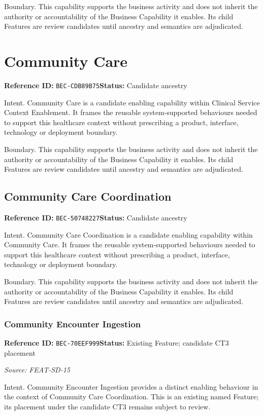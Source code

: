 \documentclass[11pt,a4paper,openany]{book}
\begin{document}
Boundary. This capability supports the business activity and does not inherit the authority or accountability of the Business Capability it enables. Its child Features are review candidates until ancestry and semantics are adjudicated.

\section{Community Care}\label{cap:bec-cdb89b75}
\noindent\textbf{Reference ID:} \texttt{BEC-CDB89B75}\quad \textbf{Status:} Candidate ancestry\par
Intent. Community Care is a candidate enabling capability within Clinical Service Context Enablement. It frames the reusable system-supported behaviours needed to support this healthcare context without prescribing a product, interface, technology or deployment boundary.

Boundary. This capability supports the business activity and does not inherit the authority or accountability of the Business Capability it enables. Its child Features are review candidates until ancestry and semantics are adjudicated.

\subsection{Community Care Coordination}\label{cap:bec-50748227}
\noindent\textbf{Reference ID:} \texttt{BEC-50748227}\quad \textbf{Status:} Candidate ancestry\par
Intent. Community Care Coordination is a candidate enabling capability within Community Care. It frames the reusable system-supported behaviours needed to support this healthcare context without prescribing a product, interface, technology or deployment boundary.

Boundary. This capability supports the business activity and does not inherit the authority or accountability of the Business Capability it enables. Its child Features are review candidates until ancestry and semantics are adjudicated.

\subsubsection{Community Encounter Ingestion}\label{cap:bec-70eef999}
\noindent\textbf{Reference ID:} \texttt{BEC-70EEF999}\quad \textbf{Status:} Existing Feature; candidate CT3 placement\par
\noindent\textit{Source: FEAT-SD-15}\par
Intent. Community Encounter Ingestion provides a distinct enabling behaviour in the context of Community Care Coordination. This is an existing named Feature; its placement under the candidate CT3 remains subject to review.
\end{document}
